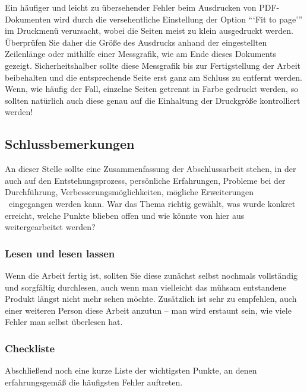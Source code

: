 Ein häufiger und leicht zu übersehender Fehler beim Ausdrucken von
PDF-Dokumenten wird durch die versehentliche Einstellung der Option
```Fit to page''' im Druckmenü verursacht, wobei die Seiten meist zu
klein ausgedruckt werden. Überprüfen Sie daher die Größe des Ausdrucks
anhand der eingestellten Zeilenlänge oder mithilfe einer Messgrafik, wie
am Ende dieses Dokuments gezeigt. Sicherheitshalber sollte diese
Messgrafik bis zur Fertigstellung der Arbeit beibehalten und die
entsprechende Seite erst ganz am Schluss zu entfernt werden. Wenn, wie
häufig der Fall, einzelne Seiten getrennt in Farbe gedruckt werden, so
sollten natürlich auch diese genau auf die Einhaltung der Druckgröße
kontrolliert werden!

\hypertarget{schlussbemerkungen}{%
\subsection{Schlussbemerkungen}\label{schlussbemerkungen}}

An dieser Stelle sollte eine Zusammenfassung der Abschlussarbeit stehen,
in der auch auf den Entstehungsprozess, persönliche Erfahrungen,
Probleme bei der Durchführung, Verbesserungsmöglichkeiten, mögliche
Erweiterungen \usw~eingegangen werden kann. War das Thema richtig
gewählt, was wurde konkret erreicht, welche Punkte blieben offen und wie
könnte von hier aus weitergearbeitet werden?

\hypertarget{lesen-und-lesen-lassen}{%
\subsubsection{Lesen und lesen lassen}\label{lesen-und-lesen-lassen}}

Wenn die Arbeit fertig ist, sollten Sie diese zunächst selbst nochmals
vollständig und sorgfältig durchlesen, auch wenn man vielleicht das
mühsam entstandene Produkt längst nicht mehr sehen möchte. Zusätzlich
ist sehr zu empfehlen, auch einer weiteren Person diese Arbeit anzutun
-- man wird erstaunt sein, wie viele Fehler man selbst überlesen hat.

\hypertarget{checkliste}{%
\subsubsection{Checkliste}\label{checkliste}}

Abschließend noch eine kurze Liste der wichtigsten Punkte, an denen
erfahrungsgemäß die häufigsten Fehler auftreten.

